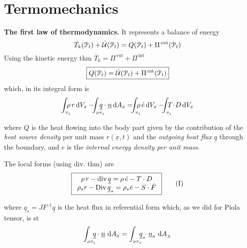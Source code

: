 
\vspace{-1em}


\section{\texorpdfstring{\color{red}Termomechanics}{}}


\textbf{The first law of thermodynamics.} It represents a balance of energy
\begin{equation*}
\dot{T_k}(\EuScript{P}_t)+\dot{\mathcal{U}}(\EuScript{P}_t)=Q(\EuScript{P}_t)+\Pi^{\,\text{ext}}(\EuScript{P}_t)
\end{equation*}
Using the kinetic energy thm $\dot{T_k}=\Pi^{\,\text{ext}}+\Pi^{\,\text{int}}$
\begin{equation*}
\boxed{Q(\EuScript{P}_t)=\dot{\mathcal{U}}(\EuScript{P}_t)+\Pi^{\,\text{int}}(\EuScript{P}_t)}
\end{equation*}
which, in its integral form is
\begin{equation*}
\int_{_{\pt_t}}\!\!\!\!\! \rho\,r\,\de V_x -\!\!\! \int_{_{\partial\pt_t}}\!\!\!\!\!\! \underline{q}\cdot \underline{n}\, \de A_x=\!\!\!\int_{_{\pt_t}}\!\!\!\!\!\rho\,\dot{e}\,\de V_x -\!\!\! \int_{_{\pt_t}}\!\!\!\!\! T\!\cdot\! D\,\de V_x
\end{equation*}

where $Q$ is the heat flowing into the body part given by the contribution of the \emph{heat source density} per unit mass $r(\underline{x},t)$ and the \emph{outgoing heat flux} $\underline{q}$ through the boundary, and $e$ is the \emph{internal energy density per unit mass}.

\smallskip

The local forms (using div. thm) are
\begin{equation*}
\boxed{
\begin{array}{c}
\rho\,r-\text{div}\,\underline{q}=\rho\,\dot{e}-T\cdot D \\
\rho_*r-\text{Div}\,\underline{q}_*=\rho_*\dot{e}-S\cdot \dot{F}
\end{array}
}
\tag{\RNum{1}}
\end{equation*}

where $\underline{q}_*=JF^{\,\text{-}1}\underline{q}$ is the heat flux in referential form which, as we did for Piola tensor, is st
\begin{equation*}
\int_{_{\partial\pt_t}}\!\!\!\! \underline{q}\cdot \underline{n}\ \de A_x= \int_{_{\partial\pt_*}}\!\!\!\! \underline{q}_*\!\!\cdot \underline{n}_*\ \de A_{_X}
\end{equation*}

